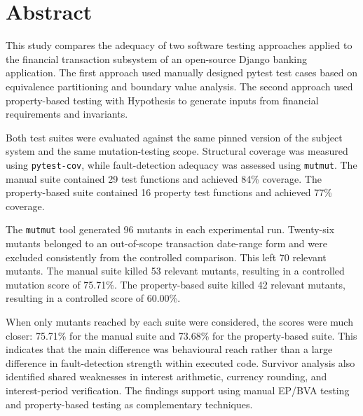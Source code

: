 \documentclass[12pt]{article}
\begin{document}

\pagestyle{plain}

\section*{Abstract}

This study compares the adequacy of two software testing approaches applied to
the financial transaction subsystem of an open-source Django banking
application. The first approach used manually designed pytest test cases based
on equivalence partitioning and boundary value analysis. The second approach
used property-based testing with Hypothesis to generate inputs from financial
requirements and invariants.

Both test suites were evaluated against the same pinned version of the subject
system and the same mutation-testing scope. Structural coverage was measured
using \texttt{pytest-cov}, while fault-detection adequacy was assessed using
\texttt{mutmut}. The manual suite contained 29 test functions and achieved
84\% coverage. The property-based suite contained 16 property test functions
and achieved 77\% coverage.

The \texttt{mutmut} tool generated 96 mutants in each experimental run. Twenty-six mutants belonged to an out-of-scope transaction date-range
form and were excluded consistently from the controlled comparison. This left
70 relevant mutants. The manual suite killed 53 relevant mutants, resulting in
a controlled mutation score of 75.71\%. The property-based suite killed 42
relevant mutants, resulting in a controlled score of 60.00\%.

When only mutants reached by each suite were considered, the scores were much
closer: 75.71\% for the manual suite and 73.68\% for the property-based suite.
This indicates that the main difference was behavioural reach rather than a
large difference in fault-detection strength within executed code. Survivor
analysis also identified shared weaknesses in interest arithmetic, currency
rounding, and interest-period verification. The findings support using manual
EP/BVA testing and property-based testing as complementary techniques.
\newpage

\tableofcontents

\newpage

\listoftables
{}
\end{document}
